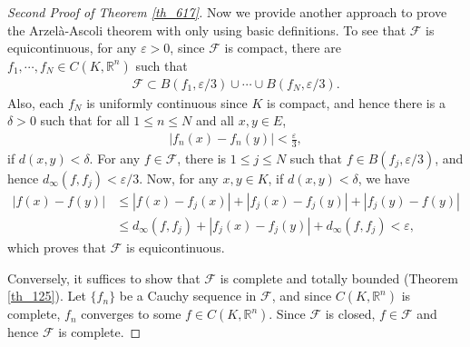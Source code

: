 \documentclass[10pt]{book}
\theoremstyle{definition}
\numberwithin{equation}{chapter}
\begin{document}
\medskip

\begin{proof}[Second Proof of Theorem \ref{th_617}]\cite{4}
Now we provide another approach to prove the Arzelà-Ascoli theorem with only using basic definitions. To see that $\mathcal{F}$ is equicontinuous, for any $\varepsilon > 0$, since $\mathcal{F}$ is compact, there are $f_1, \cdots, f_N \in C(K,\mathbb{R}^n)$ such that
\begin{align*}
    \mathcal{F} \subset B(f_1,\varepsilon/3) \cup \cdots \cup B(f_N,\varepsilon/3).
\end{align*}
Also, each $f_N$ is uniformly continuous since $K$ is compact, and hence there is a $\delta > 0$ such that for all $1 \leq n \leq N$ and all $x, y \in E$, 
\begin{align*}
    \left|f_n(x) - f_n(y)\right| < \frac{\varepsilon}{3},
\end{align*}
if $d(x,y) < \delta$. For any $f \in \mathcal{F}$, there is $1 \leq j \leq N$ such that $f \in B(f_j,\varepsilon/3)$, and hence $d_\infty(f,f_j) < \varepsilon/3$. Now, for any $x, y \in K$, if $d(x,y) < \delta$, we have
\begin{align*}
    \left|f(x) - f(y)\right| & \leq \left|f(x) - f_j(x)\right| + \left|f_j(x) - f_j(y)\right| + \left|f_j(y) - f(y)\right| \\
    & \leq d_\infty(f,f_j) + \left|f_j(x) - f_j(y)\right| + d_\infty(f,f_j) < \varepsilon,
\end{align*}
which proves that $\mathcal{F}$ is equicontinuous.

Conversely, it suffices to show that $\mathcal{F}$ is complete and totally bounded (Theorem \ref{th_125}). Let $\{f_n\}$ be a Cauchy sequence in $\mathcal{F}$, and since $C(K,\mathbb{R}^n)$ is complete, $f_n$ converges to some $f \in C(K,\mathbb{R}^n)$. Since $\mathcal{F}$ is closed, $f \in \mathcal{F}$ and hence $\mathcal{F}$ is complete.


\end{proof}
\end{document}
